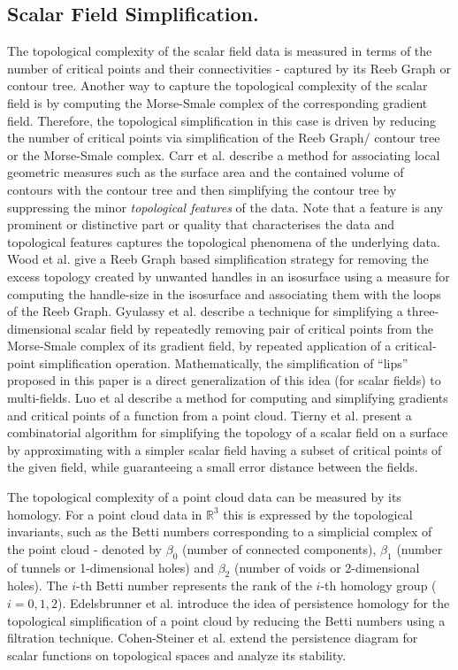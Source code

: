 \documentclass[twocolumn]{article}
\begin{document}
\subsection*{Scalar Field Simplification.} 
The topological complexity of the scalar field data is measured in
terms of the number of critical points and their connectivities -
captured by its Reeb Graph or contour tree.  Another way to capture
the topological complexity of the scalar field is by computing the Morse-Smale complex of the corresponding
gradient field. Therefore, the topological simplification
in this case is driven by reducing the number of critical points via
simplification of the Reeb Graph/ contour tree or the Morse-Smale complex.
Carr et al. \cite{2004-Carr-simplification} describe a method for associating local geometric measures such
  as the surface area and the contained volume of contours with the contour
  tree and then simplifying the contour tree by suppressing the minor
  \emph{topological features} of the data. Note that  a feature is any
  prominent or distinctive part or quality that characterises the data
  and topological features captures the topological phenomena of the underlying data.  Wood et al. \cite{2004-Wood-excessTopo} give a
  Reeb Graph based simplification strategy for removing the excess
  topology created by unwanted handles in an isosurface using a
  measure for computing the handle-size in the isosurface and associating them
  with the loops of the Reeb Graph. Gyulassy et al. \cite{2006-Gyulassy} describe a
  technique for simplifying a three-dimensional scalar field by
  repeatedly removing pair of critical points from the Morse-Smale
  complex of its gradient field, by repeated application of a critical-point
  simplification operation. Mathematically, the simplification of
  ``lips'' proposed in this paper is a direct generalization of this
  idea (for scalar fields) to multi-fields. 
Luo et al \cite{2009-Luo-Jacobi} describe a method for computing and simplifying gradients and critical points of a function from a
point cloud. Tierny et al. \cite{2012-Tierny-tvcg} present a
  combinatorial algorithm for simplifying the topology of a scalar field on a surface
  by approximating with a simpler scalar field having a subset of
  critical points of the given field, while guaranteeing a small error distance
  between the fields.

The topological complexity of a point cloud
data can be measured by its homology. For a point cloud data  in
$\mathbb{R}^3$ this is expressed by the topological invariants, such as the Betti
numbers corresponding to a simplicial complex of the point cloud
 - denoted by $\beta_0$ (number of connected components), $\beta_1$ (number of
 tunnels or 1-dimensional holes) and
$\beta_2$ (number of voids or 2-dimensional holes).  The $i$-th Betti number represents the
rank of the $i$-th homology group ($i=0, 1, 2$). Edelsbrunner et al. \cite{2002-Edels-Persist} introduce the
idea of persistence homology for the topological simplification of a
point cloud by reducing the Betti numbers using a filtration
technique. Cohen-Steiner et al. \cite{2007-Cohen-Steiner} extend the persistence diagram
for scalar functions on topological spaces and analyze its
stability. 
\end{document}

